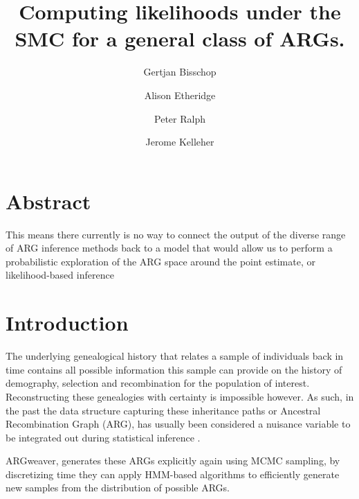 \documentclass{article}
\begin{document}
\linenumbers
\title{Computing likelihoods under the SMC for a general class of ARGs.}

\author[1, $\dagger$]{Gertjan Bisschop}

\author[2]{Alison Etheridge}
\author[3]{Peter Ralph}

\author[1]{Jerome Kelleher}

\maketitle


\section{Abstract}
This means there currently is no way to connect the output of the diverse 
range of ARG inference methods back 
to a model that would allow us to perform a probabilistic exploration of the 
ARG space around the point estimate, or likelihood-based inference

\section{Introduction}

The underlying genealogical history that relates a sample of individuals back in time
contains all possible information this sample can provide on the history of demography, 
selection and recombination for the population of interest. 
Reconstructing these genealogies with certainty is impossible however. 
As such, in the past the data structure capturing these inheritance paths 
or Ancestral Recombination Graph (ARG), has usually been considered a nuisance 
variable to be integrated out during statistical inference 
\citep{kuhner_2000, griffiths_ancestral_1996}.

ARGweaver, generates these ARGs explicitly again using MCMC sampling, by discretizing time 
they can apply HMM-based algorithms to efficiently generate new samples from the distribution of 
possible ARGs.
\end{document}
